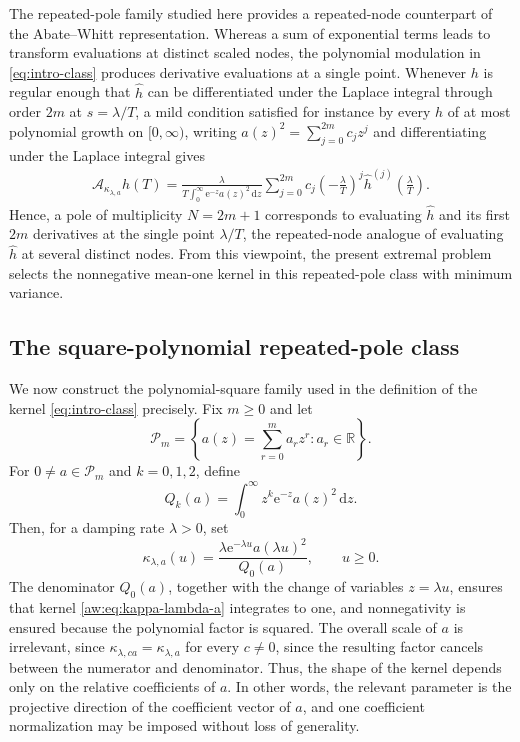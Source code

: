 \documentclass[11pt]{article}
\numberwithin{equation}{section}
\theoremstyle{definition}
\theoremstyle{remark}
\newcommand{\R}{\mathbb R}
\newcommand{\Pcal}{\mathcal P}
\newcommand{\dd}{\,\mathrm d}
\newcommand{\e}{\mathrm e}
\newcommand{\Aop}{\mathcal A}
\begin{document}
The repeated-pole family studied here provides a repeated-node counterpart of the
Abate--Whitt representation. Whereas a sum of exponential terms leads to
transform evaluations at distinct scaled nodes, the polynomial modulation in
\eqref{eq:intro-class} produces derivative evaluations at a single point.
Whenever $h$ is regular enough that $\widehat h$ can be
differentiated under the Laplace integral through order $2m$ at
$s=\lambda/T$, a mild condition satisfied for instance by every $h$ of at
most polynomial growth on $[0,\infty)$, writing $a(z)^2=\sum_{j=0}^{2m}c_jz^j$
and differentiating under the Laplace integral gives
\begin{align*}
\Aop_{\kappa_{\lambda,a}}h(T)
=\frac{\lambda}
{T\displaystyle\int_0^\infty \e^{-z}a(z)^2\dd z}
\sum_{j=0}^{2m}c_j
\left(-\frac{\lambda}{T}\right)^j
\widehat h^{(j)}\left(\frac{\lambda}{T}\right).
\end{align*}
Hence, a pole of multiplicity $N=2m+1$ corresponds to evaluating
$\widehat h$ and its first $2m$ derivatives at the single point
$\lambda/T$, the repeated-node analogue of evaluating $\widehat h$ at
several distinct nodes. From this viewpoint, the present extremal problem selects the
nonnegative mean-one kernel in this repeated-pole class with minimum
variance.




\subsection{The square-polynomial repeated-pole class}\label{sec:repeated-class}

We now construct the polynomial-square family used in the definition of the kernel \eqref{eq:intro-class} precisely. Fix $m\ge0$ and let
\[
    \Pcal_m
    =\left\{a(z)=\sum_{r=0}^{m}a_rz^r:a_r\in\R\right\}.
\]
For $0\ne a\in\Pcal_m$ and $k=0,1,2$, define
\begin{equation}\label{aw:eq:Qk}
    Q_k(a)=\int_0^\infty z^k\e^{-z}a(z)^2\dd z.
\end{equation}
Then, for a damping rate $\lambda>0$, set
\begin{equation}\label{aw:eq:kappa-lambda-a}
    \kappa_{\lambda,a}(u)
    =\frac{\lambda\e^{-\lambda u}a(\lambda u)^2}{Q_0(a)},
    \qquad u\ge0.
\end{equation}
The denominator $Q_0(a)$, together with the change of variables $z=\lambda u$, ensures that kernel \eqref{aw:eq:kappa-lambda-a} integrates to one, and nonnegativity is ensured because the polynomial factor is squared.
The overall scale of $a$ is irrelevant, since $\kappa_{\lambda,ca}=\kappa_{\lambda,a}$
for every $c\ne0$, since the resulting factor cancels between the numerator and denominator. Thus, the shape of the kernel depends only on the relative coefficients of $a$. In other words, the relevant parameter is the projective direction of the coefficient vector of $a$, and one coefficient normalization may be imposed without loss of generality.
\end{document}
